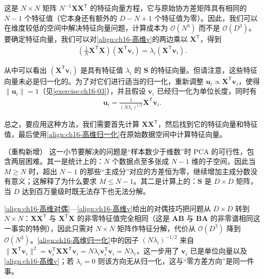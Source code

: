 \documentclass[../../main.tex]{subfiles}
\begin{document}
这是 $N\times N$ 矩阵 $N^{-1}\bm{X}\bm{X}^{\mathsf T}$ 的特征向量方程，它与原始协方差矩阵具有相同的 $N-1$ 个特征值（它本身还有额外的 $D-N+1$ 个特征值为零）。因此，我们可以在维度较低的空间中解决特征向量问题，计算成本为 $\mathcal{O}(N^3)$ 而不是 $\mathcal{O}(D^3)$。要确定特征向量，我们可以对\eqref{align:ch16-高维v}的两边乘以 $\bm{X}^{\mathsf T}$，得到
\begin{align}
  \left(\frac{1}{N}\bm{X}^{\mathsf T}\bm{X}\right)\left(\bm{X}^{\mathsf T}\bm{v}_i\right)=\lambda_i\left(\bm{X}^{\mathsf T}\bm{v}_i\right).
  \label{align:ch16-高维回代}
\end{align}

从中可以看出 $(\bm{X}^{\mathsf T}\bm{v}_i)$ 是具有特征值 $\lambda_i$ 的 $\bm{S}$ 的特征向量。但请注意，这些特征向量未必是归一化的。为了对它们进行适当的归一化，重新调整 $\bm{u}_i\propto\bm{X}^{\mathsf T}\bm{v}_i$，使得 $\|\bm{u}_i\|=1$（见\cref{exercise:ch16-03}），并且假设 $\bm{v}_i$ 已经归一化为单位长度，同时有
\begin{align}
  \bm{u}_i=\frac{1}{(N\lambda_i)^{1/2}}\bm{X}^{\mathsf T}\bm{v}_i.
  \label{align:ch16-高维归一化}
\end{align}

总之，要应用这种方法，我们需要首先计算 $\bm{X}\bm{X}^{\mathsf T}$，然后找到它的特征向量和特征值，最后使用\eqref{align:ch16-高维归一化}在原始数据空间中计算特征向量。

\begin{remark}（重构新增）
这一小节要解决的问题是“样本数少于维数”时 PCA 的可行性，包含两层困难。其一是统计上的：$N$ 个数据点至多张成 $N-1$ 维的子空间，因此当 $M\geqslant N$ 时，超出 $N-1$ 的那些“主成分”对应的方差恒为零，继续增加主成分数没有意义；这解释了为什么要求 $M\leqslant N-1$。其二是计算上的：$\bm{S}$ 是 $D\times D$ 矩阵，当 $D$ 达到百万量级时既无法存下也无法分解。

\eqref{align:ch16-高维对偶}—\eqref{align:ch16-高维v}给出的对偶技巧把问题从 $D\times D$ 转到 $N\times N$：$\bm{X}\bm{X}^{\mathsf T}$ 与 $\bm{X}^{\mathsf T}\bm{X}$ 的非零特征值完全相同（这是 $\bm{A}\bm{B}$ 与 $\bm{B}\bm{A}$ 的非零谱相同这一事实的特例），因此只需对 $N\times N$ 矩阵作特征分解，代价从 $\mathcal{O}(D^3)$ 降到 $\mathcal{O}(N^3)$。\eqref{align:ch16-高维归一化}中的因子 $(N\lambda_i)^{-1/2}$ 来自 $\|\bm{X}^{\mathsf T}\bm{v}_i\|^2=\bm{v}_i^{\mathsf T}\bm{X}\bm{X}^{\mathsf T}\bm{v}_i=N\lambda_i\bm{v}_i^{\mathsf T}\bm{v}_i=N\lambda_i$，这一步用了 $\bm{v}_i$ 已是单位向量以及\eqref{align:ch16-高维v}；若 $\lambda_i=0$ 则该方向无从归一化，这与“零方差方向”是同一件事。
\end{remark}
\end{document}
